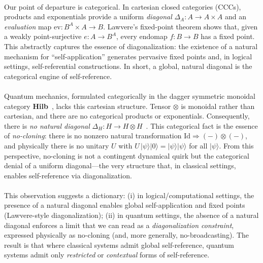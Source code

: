 \documentclass[11pt]{article}
\theoremstyle{upright}
\begin{document}
\paragraph{}
Our point of departure is categorical. In cartesian closed categories (CCCs), products and exponentials provide a uniform \emph{diagonal} $\Delta_A : A \to A \times A$ and an \emph{evaluation} map $\mathrm{ev} : B^A \times A \to B$. Lawvere's fixed-point theorem shows that, given a weakly point-surjective $e : A \to B^A$, every endomap $f : B \to B$ has a fixed point. This abstractly captures the essence of diagonalization: the existence of a natural mechanism for ``self-application'' generates pervasive fixed points and, in logical settings, self-referential constructions. In short, a global, natural diagonal is the categorical engine of self-reference.

\paragraph{}
Quantum mechanics, formulated categorically in the dagger symmetric monoidal category \textbf{Hilb}~\cite{AbramskyCoecke2004,Selinger2010}, lacks this cartesian structure. Tensor $\otimes$ is monoidal rather than cartesian, and there are no categorical products or exponentials. Consequently, there is \emph{no natural diagonal} $\Delta_H : H \to H \otimes H$~\cite{AbramskyCoecke2004,Selinger2010}. This categorical fact is the essence of \emph{no-cloning}: there is no nonzero natural transformation $\mathrm{Id} \Rightarrow (-)\otimes(-)$, and physically there is no unitary $U$ with $U \, |\psi\rangle |0\rangle = |\psi\rangle |\psi\rangle$ for all $|\psi\rangle$. From this perspective, no-cloning is not a contingent dynamical quirk but the categorical denial of a uniform diagonal---the very structure that, in classical settings, enables self-reference via diagonalization.

\paragraph{}
This observation suggests a dictionary: (i) in logical/computational settings, the presence of a natural diagonal enables global self-application and fixed points (Lawvere-style diagonalization); (ii) in quantum settings, the absence of a natural diagonal enforces a limit that we can read as a \emph{diagonalization constraint}, expressed physically as no-cloning (and, more generally, no-broadcasting). The result is that where classical systems admit global self-reference, quantum systems admit only \emph{restricted} or \emph{contextual} forms of self-reference.
\end{document}
